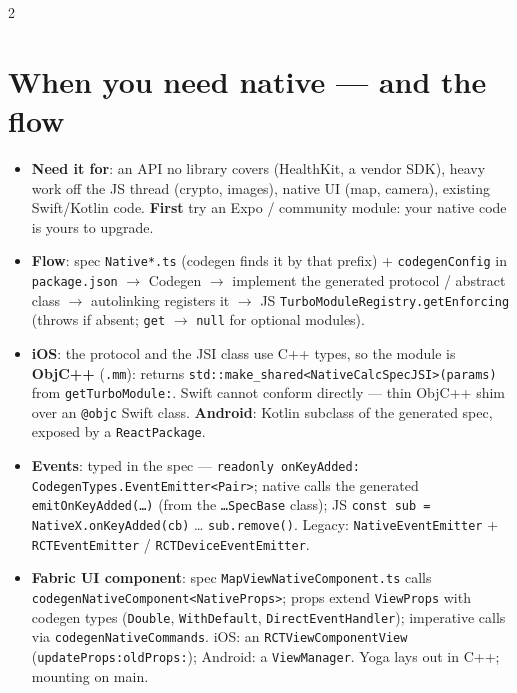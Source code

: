 \documentclass[8pt]{extarticle}
\begin{document}
\begin{multicols}{2}
\raggedright

\section{When you need native — and the flow}
\begin{itemize}
  \item \textbf{Need it for}: an API no library covers (HealthKit, a vendor SDK), heavy
        work off the JS thread (crypto, images), native UI (map, camera), existing
        Swift/Kotlin code. \textbf{First} try an Expo / community module: your native
        code is yours to upgrade.
  \item \textbf{Flow}: spec \texttt{Native*.ts} (codegen finds it by that prefix) +
        \texttt{codegenConfig} in \texttt{package.json} $\to$ Codegen $\to$ implement
        the generated protocol / abstract class $\to$ autolinking registers it $\to$ JS
        \texttt{TurboModuleRegistry.getEnforcing} (throws if absent; \texttt{get} $\to$
        \texttt{null} for optional modules).
  \item \textbf{iOS}: the protocol and the JSI class use C++ types, so the module is
        \textbf{ObjC++} (\texttt{.mm}): returns
        \texttt{std::make\_shared<NativeCalcSpecJSI>(params)} from
        \texttt{getTurboModule:}. Swift cannot conform directly — thin ObjC++ shim over an
        \texttt{@objc} Swift class. \textbf{Android}: Kotlin subclass of the generated
        spec, exposed by a \texttt{ReactPackage}.
  \item \textbf{Events}: typed in the spec —
        \texttt{readonly onKeyAdded: CodegenTypes.EventEmitter<Pair>}; native calls the
        generated \texttt{emitOnKeyAdded(…)} (from the \texttt{…SpecBase} class); JS
        \texttt{const sub = NativeX.onKeyAdded(cb)} … \texttt{sub.remove()}. Legacy:
        \texttt{NativeEventEmitter} + \texttt{RCTEventEmitter} / \texttt{RCTDeviceEventEmitter}.
  \item \textbf{Fabric UI component}: spec \texttt{MapViewNativeComponent.ts} calls
        \texttt{codegenNativeComponent<NativeProps>}; props extend
        \texttt{ViewProps} with codegen types (\texttt{Double}, \texttt{WithDefault},
        \texttt{DirectEventHandler}); imperative calls via
        \texttt{codegenNativeCommands}. iOS: an \texttt{RCTViewComponentView}
        (\texttt{updateProps:oldProps:}); Android: a \texttt{ViewManager}. Yoga lays
        out in C++; mounting on main.
\end{itemize}


\end{multicols}
\end{document}
